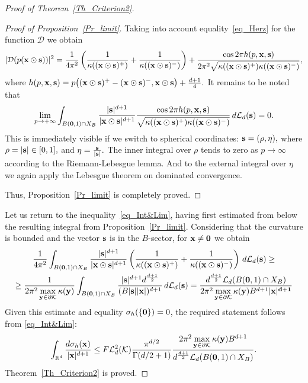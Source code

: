 \documentclass[12pt]{article}
\begin{document}
\begin{proof}[Proof of Theorem~\ref{Th_Criterion2}]
\begin{proof}[Proof of Proposition~\ref{Pr_limit}]
Taking into account equality~\eqref{eq_Herz} for the function $\mathcal{D}$ we obtain
\begin{equation}\label{eq_Asymp3}
|\mathcal{D}(p({\bf x}\odot{\bf s}))|^2=\frac{1}{4\pi^2}\left(\frac{1}{\kappa(({\bf x}\odot{\bf s})^+)}+\frac{1}{\kappa(({\bf x}\odot{\bf s})^-)}\right)+\frac{\cos2\pi h(p,{\bf x},{\bf s})}{2\pi^2\sqrt{\kappa(({\bf x}\odot{\bf s})^+)\kappa(({\bf x}\odot{\bf s})^-)}},
\end{equation} 
where ${h(p,{\bf x},{\bf s})=p\bigl(({\bf x}\odot{\bf s})^+-({\bf x}\odot{\bf s})^-,{\bf x}\odot{\bf s}\bigr)+\frac{d+1}{4}}.$
It remains to be noted that
$$
\lim_{p\to+\infty}\int_{B({\bf0},1)\cap X_B}\frac{|{\bf s}|^{d+1}}{|{\bf x}\odot{\bf s}|^{d+1}}\frac{\cos2\pi h(p,{\bf x},{\bf s})}{\sqrt{\kappa(({\bf x}\odot{\bf s})^+)\kappa(({\bf x}\odot{\bf s})^-)}}\,d\mathcal{L}_d({\bf s})=0.
$$
This is immediately visible if we switch to spherical coordinates: ${{\bf s}=(\rho,\eta)},$ where ${\rho=|{\bf s}|\in[0,1]},$ and ${\eta=\frac{{\bf s}}{|{\bf s}|}}.$ The inner integral over $\rho$ tends to zero as ${p\to\infty}$ according to the Riemann-Lebesgue lemma. And to the external integral over $\eta$ we again apply the Lebesgue theorem on dominated convergence.

Thus, Proposition~\ref{Pr_limit} is completely proved.
\end{proof}

Let us return to the inequality~\eqref{eq_Int&Lim}, having first estimated from below the resulting integral from Proposition~\ref{Pr_limit}. Considering that the curvature is bounded and the vector ${\bf s}$ is in the $B$-sector, for ${\bf x}\neq{\bf0}$ we obtain
\begin{multline*}
\frac{1}{4\pi^2}\int_{B({\bf0},1)\cap X_B}\frac{|{\bf s}|^{d+1}}{|{\bf x}\odot{\bf s}|^{d+1}}
\left(\frac{1}{\kappa(({\bf x}\odot{\bf s})^+)}+\frac{1}{\kappa(({\bf x}\odot{\bf s})^-)}\right)\,d\mathcal{L}_d({\bf s})\geq\\
\geq\frac{1}{2\pi^2\max\limits_{{\bf y}\in\partial\mathcal{K}}\kappa({\bf y})}\int_{B({\bf0},1)\cap X_B}\frac{|{\bf s}|^{d+1}d^{\frac{d+1}{2}}}{(B|{\bf s}||{\bf x}|)^{d+1}}\,d\mathcal{L}_d({\bf s})=\frac{d^{\frac{d+1}{2}}\mathcal{L}_d(B({\bf0},1)\cap X_B)}{2\pi^2\max\limits_{{\bf y}\in\partial\mathcal{K}}\kappa({\bf y})B^{d+1}|\bf x|^{d+1}}
\end{multline*}
Given this estimate and equality ${\sigma_h(\{{\bf 0}\})=0}$, the required statement follows from \eqref{eq_Int&Lim}:
$$
\int_{\mathbb{R}^d}\frac{d\sigma_h({\bf x})}{|{\bf x}|^{d+1}}\leq F\mathcal{L}^2_d(\mathcal{K})\frac{\pi^{d/2}}{\Gamma(d/2+1)}
\frac{2\pi^2\max\limits_{{\bf y}\in\partial\mathcal{K}}\kappa({\bf y})B^{d+1}}{d^{\frac{d+1}{2}}\mathcal{L}_d(B({\bf0},1)\cap X_B)}.
$$
Theorem~\ref{Th_Criterion2} is proved.
\end{proof}
\end{document}
